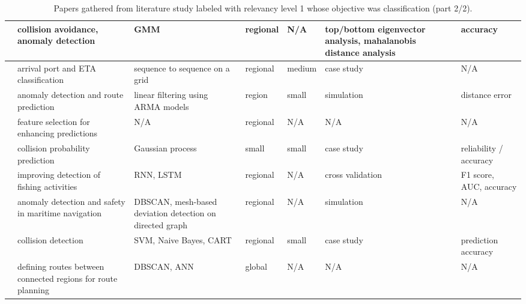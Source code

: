 \noindent
\begin{table}[htbp]
{\small\begin{tabularx}{1.2\textwidth}{p{0.6in} X X p{0.5in} p{0.4in} X p{0.5in}}
    \midrule
    \cite{Murray2020UnsupervisedNavigation} & collision avoidance, anomaly detection & GMM & regional & N/A & top/bottom eigenvector analysis, mahalanobis distance analysis & accuracy \\ \midrule
    \cite{Nguyen2018GrandGrid} & arrival port and ETA classification & sequence to sequence on a grid & regional & medium & case study & N/A \\ \midrule
    \cite{Patmanidis2016MaritimeData} & anomaly detection and route prediction & linear filtering using ARMA models & region & small & simulation & distance error \\ \midrule
    \cite{Prochazka2020FeatureTransportation} & feature selection for enhancing predictions & N/A & regional & N/A & N/A & N/A \\ \midrule
    \cite{Rong2020CollisionTrajectories} & collision probability prediction & Gaussian process & small & small & case study & reliability / accuracy \\ \midrule
    \cite{Shen2020ALearning} & improving detection of fishing activities & RNN, LSTM & regional & N/A & cross validation & F1 score, AUC, accuracy \\ \midrule
    \cite{Tang2020DetectionModel} & anomaly detection and safety in maritime navigation & DBSCAN, mesh-based deviation detection on directed graph & regional & N/A & simulation & N/A \\ \midrule
    \cite{Watawana2018AnalyseDataset} & collision detection & SVM, Naive Bayes, CART & regional & small & case study & prediction accuracy \\ \midrule
    \cite{Wen2020AutomaticMethod} & defining routes between connected regions for route planning & DBSCAN, ANN & global & N/A & N/A & N/A \\ \bottomrule
\end{tabularx}}
\caption{Papers gathered from literature study labeled with relevancy level 1 whose objective was classification (part 2/2).}
\label{tab:lit_review_cat_1_6}
\end{table}
